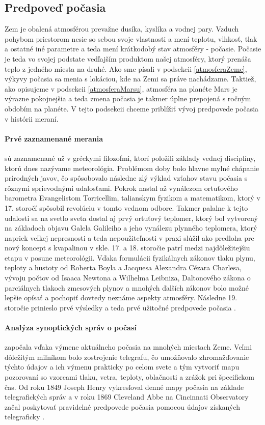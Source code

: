 \newpage
\subsection{Predpoveď počasia}
Zem je obalená atmosférou prevažne dusíka, kyslíka a vodnej pary. Vzduch pohybom priestorom nesie so sebou svoje vlastnosti a mení teplotu, vlhkosť, tlak a ostatné iné parametre a teda mení krátkodobý stav atmosféry - počasie. Počasie je teda vo svojej podstate vedľajším produktom našej atmosféry, ktorý prenáša teplo z jedného miesta na druhé.
Ako sme písali v podsekcii \ref{atmosferaZeme}, výkyvy počasia sa menia s lokáciou, kde na Zemi sa práve nachádzame. Taktiež, ako opisujeme v podsekcii \ref{atmosferaMarsu}, atmosféra na planéte Mars je výrazne pokojnejšia a teda zmena počasia je takmer úplne prepojená s ročným obdobím na planéte.
V tejto podsekcii chceme priblížiť vývoj predpovede počasia v histórii meraní.


\paragraph{Prvé zaznamenané merania} sú zaznamenané už v gréckymi filozofmi, ktorí položili základy vednej disciplíny, ktorú dnes nazývame meteorológia. Problémom doby bolo hlavne mylné chápanie prírodných javov, čo spôsobovalo následne zlý výklad vzťahov stavu počasia s rôznymi sprievodnými udalosťami. Pokrok nastal až vynálezom ortuťového barometra Evangelistom Torricellim, talianskym fyzikom a matematikom, ktorý v 17. storočí spôsobil revolúciu v tomto vednom odbore. Takmer palalne k tejto udalosti sa na svetlo sveta dostal aj prvý ortuťový teplomer, ktorý bol vytvorený na základoch objavu Galela Galileiho a jeho vynálezu plynného teplomera, ktorý napriek veľkej nepresnosti a teda nepoužiteľnosti v praxi slúžil ako predloha pre nový koncept s kvapalinou v skle.
17. a 18. storočie patrí medzi najdôležitejšiu etapu v posune meteorológii. Vďaka formulácii fyzikálnych zákonov tlaku plynu, teploty a hustoty od Roberta Boyla a Jacquesa Alexandra Cézara Charlesa, vývoju počtov od Isaaca Newtona a Wilhelma Leibniza, Daltonového zákona o parciálnych tlakoch zmesových plynov a mnohých ďalších zákonov bolo možné lepšie opísať a pochopiť dovtedy neznáme aspekty atmosféry. Následne 19. storočie prinieslo prvé výsledky a teda prvé užitočné predpovede počasia \cite{meteo}.

\paragraph{Analýza synoptických správ o počasí} započala vďaka výmene aktuálneho počasia na mnohých miestach Zeme. Veľmi dôležitým miľníkom bolo zostrojenie telegrafu, čo umožňovalo zhromažďovanie týchto údajov a ich výmenu prakticky po celom svete a tým vytvoriť mapu pozorovaní so vzorcami tlaku, vetra, teploty, oblačnosti a zrážok pri špecifickom čas. Od roku 1849 Joseph Henry vykresľoval denné mapy počasia na základe telegrafických správ a v roku 1869 Cleveland Abbe na Cincinnati Observatory začal poskytovať pravidelné predpovede počasia pomocou údajov získaných telegraficky \cite{meteo}.

